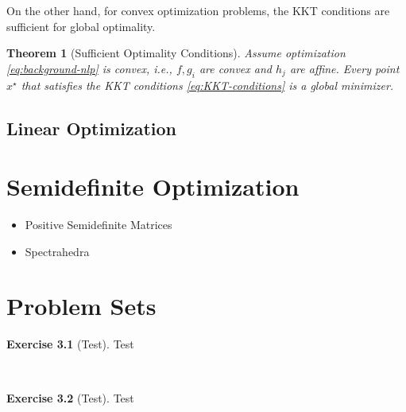 \documentclass[
]{book}
\providecommand{\tightlist}{%
  \setlength{\itemsep}{0pt}\setlength{\parskip}{0pt}}
\newtheorem{theorem}{Theorem}[chapter]
\theoremstyle{definition}
\theoremstyle{definition}
\theoremstyle{definition}
\newtheorem{exercise}{Exercise}[chapter]
\theoremstyle{definition}
\theoremstyle{remark}
\begin{document}
On the other hand, for convex optimization problems, the KKT conditions are sufficient for global optimality.

\begin{theorem}[Sufficient Optimality Conditions]
\protect\hypertarget{thm:KKTSufficient}{}\label{thm:KKTSufficient}Assume optimization \eqref{eq:background-nlp} is convex, i.e., \(f,g_i\) are convex and \(h_j\) are affine. Every point \(x^\star\) that satisfies the KKT conditions \eqref{eq:KKT-conditions} is a global minimizer.
\end{theorem}

\hypertarget{background:linear:optimization}{%
\section{Linear Optimization}\label{background:linear:optimization}}

\hypertarget{sdp}{%
\chapter{Semidefinite Optimization}\label{sdp}}

\begin{itemize}
\tightlist
\item
  Positive Semidefinite Matrices
\item
  Spectrahedra
\end{itemize}

\hypertarget{psets}{%
\chapter{Problem Sets}\label{psets}}

\begin{exercise}[Test]
\protect\hypertarget{exr:test}{}\label{exr:test}Test
\end{exercise}

~

\begin{exercise}[Test]
\protect\hypertarget{exr:test}{}\label{exr:test}Test
\end{exercise}

  
\end{document}
